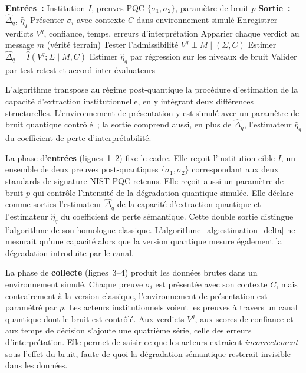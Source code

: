 \begin{sloppypar}
\begin{algorithm}[H]
\caption{Estimation empirique de $\Delta_q$}
\label{alg:estimation_delta_q}
\begin{algorithmic}[1]
\State \textbf{Entr\'ees~:} Institution $I$, preuves PQC $\{\sigma_1, \sigma_2\}$,
       param\`etre de bruit $p$
\State \textbf{Sortie~:} $\hat\Delta_q$, $\hat\eta_q$
\State Pr\'esenter $\sigma_i$ avec contexte $C$ dans environnement simul\'e
\State Enregistrer verdicts $V^q$, confiance, temps, erreurs d'interpr\'etation
\State Apparier chaque verdict au message $m$ (v\'erit\'e terrain)
\State Tester l'admissibilit\'e $V^q \perp M \mid (\Sigma, C)$
\State Estimer $\hat\Delta_q = \hat I(V^q;\Sigma \mid M, C)$
\State Estimer $\hat\eta_q$ par r\'egression sur les niveaux de bruit
\State Valider par test-retest et accord inter-\'evaluateurs
\end{algorithmic}
\end{algorithm}

L'algorithme transpose au r\'egime post-quantique la proc\'edure
d'estimation de la capacit\'e d'extraction institutionnelle, en y
int\'egrant deux diff\'erences structurelles. L'environnement de
pr\'esentation y est simul\'e avec un param\`etre de bruit quantique
contr\^ol\'e~; la sortie comprend aussi, en plus de $\hat\Delta_q$,
l'estimateur $\hat\eta_q$ du coefficient de perte
d'interpr\'etabilit\'e.

La phase d'\textbf{entr\'ees} (lignes~1--2) fixe le cadre. Elle re\c{c}oit
l'institution cible $I$, un ensemble de deux preuves post-quantiques
$\{\sigma_1, \sigma_2\}$ correspondant aux deux standards de signature NIST
PQC retenus. Elle re\c{c}oit aussi un param\`etre de bruit $p$ qui contr\^ole l'intensit\'e
de la d\'egradation quantique simul\'ee. Elle d\'eclare comme sorties
l'estimateur $\hat\Delta_q$ de la capacit\'e d'extraction quantique et
l'estimateur $\hat\eta_q$ du coefficient de perte s\'emantique. Cette double
sortie distingue l'algorithme de son homologue classique.
L'algorithme~\ref{alg:estimation_delta} ne mesurait qu'une capacit\'e alors que la
version quantique mesure \'egalement la d\'egradation introduite par le
canal.

La phase de \textbf{collecte} (lignes~3--4) produit les donn\'ees brutes
dans un environnement simul\'e. Chaque preuve $\sigma_i$ est pr\'esent\'ee
avec son contexte $C$, mais contrairement \`a la version classique,
l'environnement de pr\'esentation est param\'etr\'e par $p$. Les
acteurs institutionnels voient les preuves \`a travers un canal quantique
dont le bruit est contr\^ol\'e. Aux verdicts $V^q$, aux scores de confiance et
aux temps de d\'ecision s'ajoute une quatri\`eme s\'erie, celle des erreurs
d'interpr\'etation. Elle permet de saisir ce que les acteurs extraient
\emph{incorrectement} sous l'effet du bruit, faute de quoi la d\'egradation
s\'emantique resterait invisible dans les donn\'ees.


\end{sloppypar}
